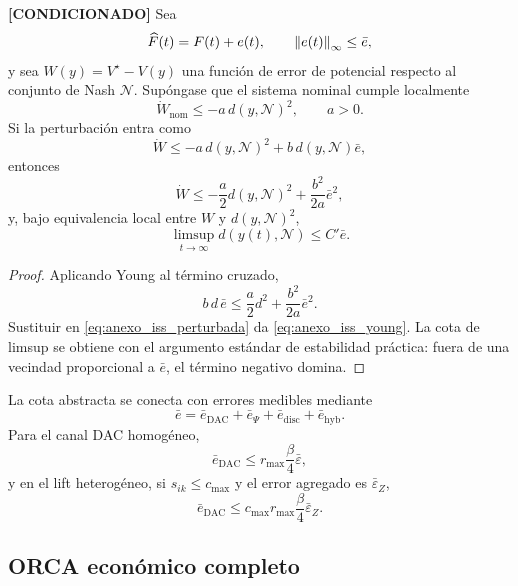 \begin{proposicion}
\textbf{[CONDICIONADO]}
Sea
\[
  \widehat F(t)=F(t)+e(t),
  \qquad
  \left\|e(t)\right\|_\infty\le\bar e,
\]
y sea $W(y)=V^\star-V(y)$ una función de error de potencial respecto al conjunto de
Nash $\mathcal{N}$. Supóngase que el sistema nominal cumple localmente
\begin{equation}
  \dot W_{\mathrm{nom}}
  \le
  -a\,d(y,\mathcal{N})^2,
  \qquad a>0.
  \label{eq:anexo_iss_nominal}
\end{equation}
Si la perturbación entra como
\begin{equation}
  \dot W
  \le
  -a\,d(y,\mathcal{N})^2
  +
  b\,d(y,\mathcal{N})\bar e,
  \label{eq:anexo_iss_perturbada}
\end{equation}
entonces
\begin{equation}
  \dot W
  \le
  -\frac{a}{2}d(y,\mathcal{N})^2
  +
  \frac{b^2}{2a}\bar e^2,
  \label{eq:anexo_iss_young}
\end{equation}
y, bajo equivalencia local entre $W$ y $d(y,\mathcal{N})^2$,
\begin{equation}
  \limsup_{t\to\infty}d(y(t),\mathcal{N})
  \le
  C'\bar e.
  \label{eq:anexo_iss_limsup}
\end{equation}
\end{proposicion}

\begin{proof}
Aplicando Young al término cruzado,
\[
  b\,d\,\bar e
  \le
  \frac{a}{2}d^2+\frac{b^2}{2a}\bar e^2.
\]
Sustituir en \eqref{eq:anexo_iss_perturbada} da
\eqref{eq:anexo_iss_young}. La cota de limsup se obtiene con el argumento estándar de
estabilidad práctica: fuera de una vecindad proporcional a $\bar e$, el término
negativo domina.
\end{proof}

La cota abstracta se conecta con errores medibles mediante
\[
  \bar e
  =
  \bar e_{\mathrm{DAC}}
  +
  \bar e_{\Psi}
  +
  \bar e_{\mathrm{disc}}
  +
  \bar e_{\mathrm{hyb}}.
\]
Para el canal DAC homogéneo,
\[
  \bar e_{\mathrm{DAC}}
  \le
  r_{\max}\frac{\beta}{4}\bar\varepsilon,
\]
y en el lift heterogéneo, si $s_{ik}\le c_{\max}$ y el error agregado es
$\bar\varepsilon_Z$,
\[
  \bar e_{\mathrm{DAC}}
  \le
  c_{\max}r_{\max}\frac{\beta}{4}\bar\varepsilon_Z.
\]

\subsection{ORCA económico completo}
\label{subsec:orca-economico}

